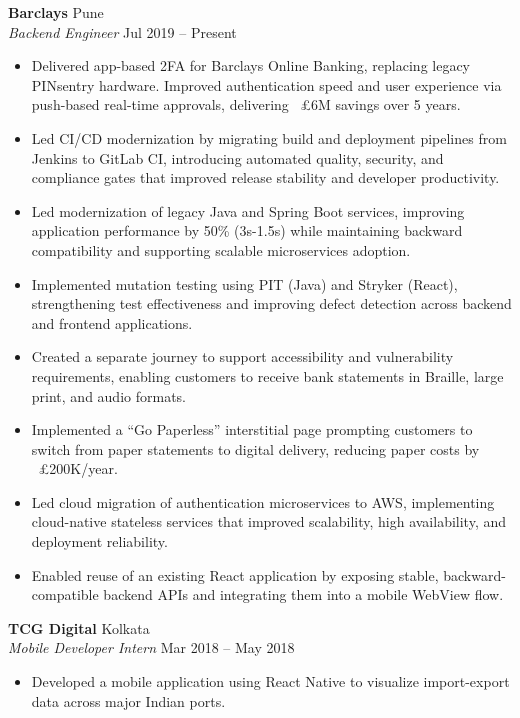 \documentclass[10pt,a4paper]{article}
\begin{document}
\textbf{Barclays} \hfill Pune \\
\textit{Backend Engineer} \hfill Jul 2019 -- Present
\begin{itemize}[leftmargin=*]
    \item Delivered app-based 2FA for Barclays Online Banking, replacing legacy PINsentry hardware. Improved authentication speed and user experience via push-based real-time approvals, delivering ~£6M savings over 5 years.
    \item Led CI/CD modernization by migrating build and deployment pipelines from Jenkins to GitLab CI, introducing automated quality, security, and compliance gates that improved release stability and developer productivity.
    \item Led modernization of legacy Java and Spring Boot services, improving application performance by 50\% (3s-1.5s) while maintaining backward compatibility and supporting scalable microservices adoption.
    \item Implemented mutation testing using PIT (Java) and Stryker (React), strengthening test effectiveness and improving defect detection across backend and frontend applications.
    \item Created a separate journey to support accessibility and vulnerability requirements, enabling customers to receive bank statements in Braille, large print, and audio formats.
    \item Implemented a “Go Paperless” interstitial page prompting customers to switch from paper statements to digital delivery, reducing paper costs by ~£200K/year.
    \item Led cloud migration of authentication microservices to AWS, implementing cloud-native stateless services that improved scalability, high availability, and deployment reliability.
    \item Enabled reuse of an existing React application by exposing stable, backward-compatible backend APIs and integrating them into a mobile WebView flow.
\end{itemize}

\vspace{4pt}

\textbf{TCG Digital} \hfill Kolkata \\
\textit{Mobile Developer Intern} \hfill Mar 2018 -- May 2018
\begin{itemize}[leftmargin=*]
    \item Developed a mobile application using React Native to visualize import-export data across major Indian ports.
\end{itemize}
\end{document}
